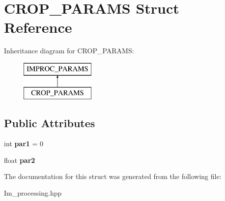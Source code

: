 \hypertarget{struct_c_r_o_p___p_a_r_a_m_s}{\section{C\+R\+O\+P\+\_\+\+P\+A\+R\+A\+M\+S Struct Reference}
\label{struct_c_r_o_p___p_a_r_a_m_s}
}
Inheritance diagram for C\+R\+O\+P\+\_\+\+P\+A\+R\+A\+M\+S\+:\begin{figure}[H]
\begin{center}
\leavevmode
\includegraphics[height=2.000000cm]{struct_c_r_o_p___p_a_r_a_m_s}
\end{center}
\end{figure}
\subsection*{Public Attributes}
\begin{DoxyCompactItemize}
\item 
\hypertarget{struct_c_r_o_p___p_a_r_a_m_s_a2c691b79b6a12648ad3468bbb594a373}{int {\bfseries par1} = 0}\label{struct_c_r_o_p___p_a_r_a_m_s_a2c691b79b6a12648ad3468bbb594a373}

\item 
\hypertarget{struct_c_r_o_p___p_a_r_a_m_s_afe374993a90303a45b0db511388c2d58}{float {\bfseries par2}}\label{struct_c_r_o_p___p_a_r_a_m_s_afe374993a90303a45b0db511388c2d58}

\end{DoxyCompactItemize}


The documentation for this struct was generated from the following file\+:\begin{DoxyCompactItemize}
\item 
Im\+\_\+processing.\+hpp\end{DoxyCompactItemize}
